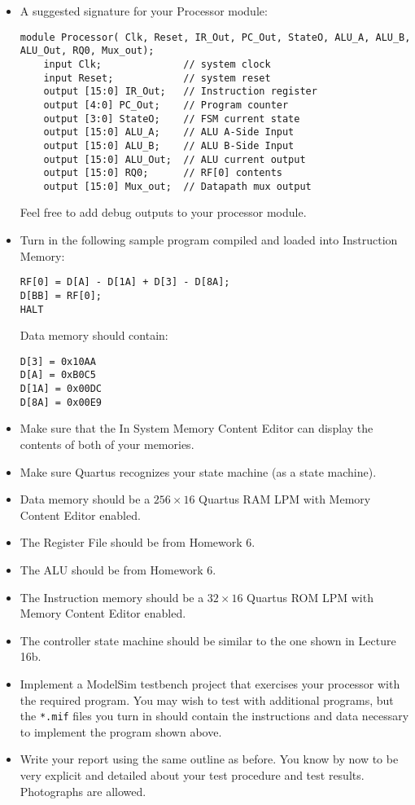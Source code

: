 \begin{itemize}
    \item A suggested signature for your Processor module:

    \begin{lstlisting}
module Processor( Clk, Reset, IR_Out, PC_Out, StateO, ALU_A, ALU_B, ALU_Out, RQ0, Mux_out);
    input Clk;              // system clock
    input Reset;            // system reset
    output [15:0] IR_Out;   // Instruction register
    output [4:0] PC_Out;    // Program counter
    output [3:0] StateO;    // FSM current state
    output [15:0] ALU_A;    // ALU A-Side Input
    output [15:0] ALU_B;    // ALU B-Side Input
    output [15:0] ALU_Out;  // ALU current output
    output [15:0] RQ0;      // RF[0] contents
    output [15:0] Mux_out;  // Datapath mux output
    \end{lstlisting}

    Feel free to add debug outputs to your processor module.

    \item Turn in the following sample program compiled and loaded into Instruction Memory:

    \begin{lstlisting}[numbers=none]
RF[0] = D[A] - D[1A] + D[3] - D[8A];
D[BB] = RF[0];
HALT
    \end{lstlisting}

    Data memory should contain:

    \begin{lstlisting}[numbers=none]
D[3] = 0x10AA
D[A] = 0xB0C5
D[1A] = 0x00DC
D[8A] = 0x00E9
    \end{lstlisting}
    \item Make sure that the In System Memory Content Editor can display the contents of both of your memories.
    \item Make sure Quartus recognizes your state machine (as a state machine).
    \item Data memory should be a $256 \times 16$ Quartus RAM LPM with Memory Content Editor enabled.
    \item The Register File should be from Homework 6.
    \item The ALU should be from Homework 6.
    \item The Instruction memory should be a $32 \times  16$ Quartus ROM LPM with Memory Content Editor enabled.
    \item The controller state machine should be similar to the one shown in Lecture 16b.
    \item Implement a ModelSim testbench project that exercises your processor with the required program.
    You may wish to test with additional programs,
    but the \verb|*.mif| files you turn in should contain the instructions
    and data necessary to implement the program shown above.
    \item Write your report using the same outline as before.
    You know by now to be very explicit and detailed about your test procedure and test results.
    Photographs are allowed.
\end{itemize}